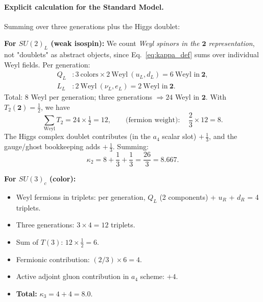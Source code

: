 \documentclass{article}
\numberwithin{equation}{section}
\theoremstyle{plain}
\theoremstyle{definition}
\theoremstyle{remark}
\begin{document}
\paragraph{Explicit calculation for the Standard Model.}
Summing over three generations plus the Higgs doublet:

\textbf{For $SU(2)_L$ (weak isospin):}
We count \emph{Weyl spinors in the $\mathbf{2}$ representation}, not "doublets" as abstract objects, since Eq.~\eqref{eq:kappa_def} sums over individual Weyl fields. Per generation:
\begin{align*}
Q_L &: 3~\text{colors}\times 2~\text{Weyl}~(u_L, d_L) = 6~\text{Weyl in}~\mathbf{2}, \\
L_L &: 2~\text{Weyl}~(\nu_L, e_L) = 2~\text{Weyl in}~\mathbf{2}.
\end{align*}
Total: $8$ Weyl per generation; three generations $\Rightarrow 24$ Weyl in $\mathbf{2}$.
With $T_2(\mathbf{2})=\tfrac12$, we have
\[
\sum_{\text{Weyl}} T_2 = 24\times \tfrac12 = 12,\qquad
\text{(fermion weight)}:\quad \frac{2}{3}\times 12 = 8.
\]
The Higgs complex doublet contributes (in the $a_4$ scalar slot) $+\,\tfrac{1}{3}$, and the gauge/ghost bookkeeping adds $+\,\tfrac{1}{3}$.
Summing:
\[
\boxed{\kappa_2 = 8 + \frac{1}{3} + \frac{1}{3} = \frac{26}{3}=8.667.}
\]

\textbf{For $SU(3)_c$ (color):}
\begin{itemize}
    \item Weyl fermions in triplets: per generation, $Q_L$ (2 components) + $u_R$ + $d_R$ = 4 triplets.
    \item Three generations: $3 \times 4 = 12$ triplets.
    \item Sum of $T(3)$: $12 \times \tfrac{1}{2} = 6$.
    \item Fermionic contribution: $(2/3) \times 6 = 4$.
    \item Active adjoint gluon contribution in $a_4$ scheme: $+4$.
    \item \textbf{Total:} $\kappa_3 = 4 + 4 = \boxed{8.0}$.
\end{itemize}
\end{document}
